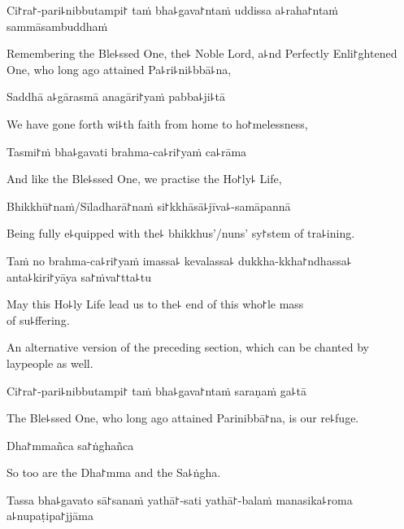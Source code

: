 Ci꜓ra꜓-pari꜕nibbutampi꜓ taṁ bha꜕gava꜓ntaṁ uddissa a꜕raha꜓ntaṁ sammāsambuddhaṁ

\begin{english}
  Remembering the Ble꜕ssed One, the꜕ Noble Lord, a꜕nd Perfectly Enli꜓ghtened One, who long ago attained Pa꜕ri꜕ni꜕bbā꜕na,
\end{english}

Saddhā a꜕gārasmā anagāri꜓yaṁ pabba꜕ji꜕tā

\begin{english}
  We have gone forth wi꜕th faith from home to ho꜓melessness,
\end{english}

Tasmi꜓ṁ bha꜕gavati brahma-ca꜕ri꜓yaṁ ca꜕rāma

\begin{english}
  And like the Ble꜕ssed One, we practise the Ho꜓ly꜕ Life,
\end{english}

Bhikkhū꜓naṁ/Sīladharā꜓naṁ si꜓kkhāsā꜕jīva꜕-samāpannā

\begin{english}
  Being fully e꜕quipped with the꜕ bhikkhus'/nuns' sy꜓stem of tra꜕ining.
\end{english}

Taṁ no brahma-ca꜕ri꜓yaṁ imassa꜕ kevalassa꜕ dukkha-kkha꜓ndhassa꜕ anta꜕kiri꜓yāya sa꜓ṁva꜓tta꜕tu

\begin{english}
  May this Ho꜕ly Life lead us to the꜕ end of this who꜓le mass\\ of su꜕ffering.
\end{english}

\clearpage

\begin{instruction}
  An alternative version of the preceding section, which can be chanted by laypeople as well.
\end{instruction}

Ci꜓ra꜓-pari꜕nibbutampi꜓ taṁ bha꜕gava꜓ntaṁ saraṇaṁ ga꜕tā

\begin{english}
  The Ble꜕ssed One, who long ago attained Parinibbā꜓na, is our re꜕fuge.
\end{english}

Dha꜓mmañca sa꜓ṅghañca

\begin{english}
  So too are the Dha꜓mma and the Sa꜕ṅgha.
\end{english}

Tassa bha꜕gavato sā꜓sanaṁ yathā꜓-sati yathā꜓-balaṁ manasika꜕roma a꜕nupaṭipa꜓jjāma

